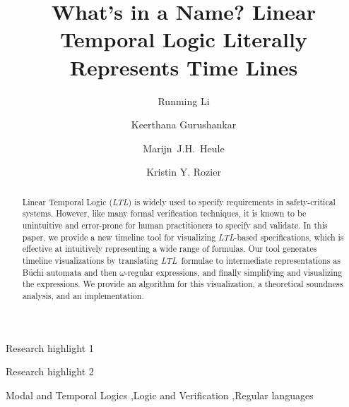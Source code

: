 \documentclass[preprint,12pt]{elsarticle}
\theoremstyle{definition}
\theoremstyle{remark}
\newcommand{\ltl}{\textit{LTL}}
\newcommand{\Buchi}{B\"{u}chi }
\begin{document}
\begin{frontmatter}
    \title{What's in a Name? Linear Temporal Logic Literally Represents Time Lines}

	\author[inst1]{Runming Li}

	\author[inst1]{Keerthana Gurushankar}

    \author[inst1]{Marijn~J.H.~Heule}
    
    \author[inst2]{Kristin Y. Rozier}




    \begin{abstract}
        Linear Temporal Logic (\ltl) is widely used to specify requirements in safety-critical systems.
        However, like many formal verification techniques, it is known to be unintuitive and error-prone for human practitioners to specify and validate.
        In this paper, we provide a new timeline tool for visualizing \ltl-based specifications, which is effective at intuitively representing a wide range of formulas.
        Our tool generates timeline visualizations by translating \ltl\ formulae to intermediate representations as \Buchi automata and then $\omega$-regular expressions, and finally simplifying and visualizing the expressions.
        We provide an algorithm for this visualization, a theoretical soundness analysis, and an implementation.
    \end{abstract}

    \begin{highlights} %
        \item Research highlight 1
        \item Research highlight 2
    \end{highlights}

    \begin{keyword}
        Modal and Temporal Logics
        \sep Logic and Verification
        \sep Regular languages
    \end{keyword}
\end{frontmatter}
\end{document}
